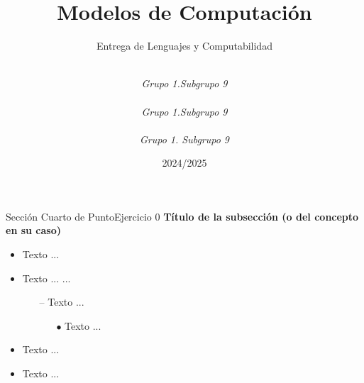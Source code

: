 \documentclass[10pt, envcountsect, presentation, aspectratio=169]{beamer}
\title[Nombre]{Modelos de Computación}
\subtitle{Entrega de Lenguajes y Computabilidad} %
\author[Carrillo G., Gallego J., Ibarrola Y.] %
{
	\sc{Ginés Carrillo Ibáñez}\\  %
	\textit{Grupo 1.Subgrupo 9}\\
	\sc{Juan Diego Gallego Nicolás}\\ %
	\textit{Grupo 1.Subgrupo 9}\\ 
	\sc{Juan Diego Gallego Nicolás}\\ %
	\textit{Grupo 1. Subgrupo 9}\\ 
}
\institute[GII]%
{
	\textit{Universidad de Murcia}
}
\date{2024/2025} %
\begin{document}
	



\begin{frame}[plain]
	\titlepage
\end{frame}


\begin{frame}{Sección Cuarto de Punto}{Ejercicio 0}
\textbf{Título de la subsección (o del concepto en su caso)}
	\begin{itemize}
	\item Texto ...
	\item Texto ... \citep{Russell2020} ...
		\begin{itemize}
		\normalsize %
		\item[--] Texto ...
		
			\begin{itemize}
			\normalsize %
			\item[$\bullet$] Texto ...
			\end{itemize}	
			\end{itemize} 
	\item Texto ...		
	\item Texto ...
	\end{itemize}
\end{frame}

\end{document}
